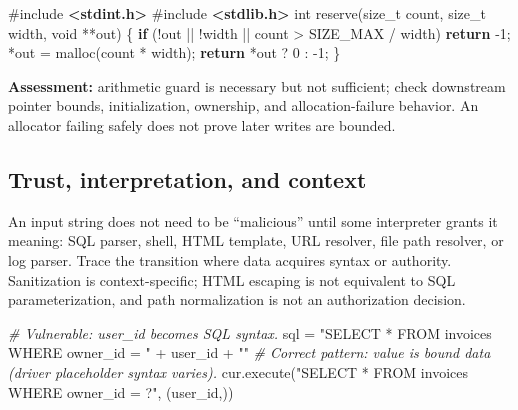 \documentclass[
  letterpaper,
]{article}
\newenvironment{Shaded}{}{}
\newcommand{\CommentTok}[1]{\textcolor[rgb]{0.38,0.63,0.69}{\textit{#1}}}
\newcommand{\ControlFlowTok}[1]{\textcolor[rgb]{0.00,0.44,0.13}{\textbf{#1}}}
\newcommand{\DataTypeTok}[1]{\textcolor[rgb]{0.56,0.13,0.00}{#1}}
\newcommand{\DecValTok}[1]{\textcolor[rgb]{0.25,0.63,0.44}{#1}}
\newcommand{\ImportTok}[1]{\textcolor[rgb]{0.00,0.50,0.00}{\textbf{#1}}}
\newcommand{\NormalTok}[1]{#1}
\newcommand{\OperatorTok}[1]{\textcolor[rgb]{0.40,0.40,0.40}{#1}}
\newcommand{\PreprocessorTok}[1]{\textcolor[rgb]{0.74,0.48,0.00}{#1}}
\newcommand{\StringTok}[1]{\textcolor[rgb]{0.25,0.44,0.63}{#1}}
\begin{document}
\begin{Shaded}
\begin{Highlighting}[]
\PreprocessorTok{\#include }\ImportTok{\textless{}stdint.h\textgreater{}}
\PreprocessorTok{\#include }\ImportTok{\textless{}stdlib.h\textgreater{}}
\DataTypeTok{int}\NormalTok{ reserve}\OperatorTok{(}\DataTypeTok{size\_t}\NormalTok{ count}\OperatorTok{,} \DataTypeTok{size\_t}\NormalTok{ width}\OperatorTok{,} \DataTypeTok{void} \OperatorTok{**}\NormalTok{out}\OperatorTok{)} \OperatorTok{\{}
    \ControlFlowTok{if} \OperatorTok{(!}\NormalTok{out }\OperatorTok{||} \OperatorTok{!}\NormalTok{width }\OperatorTok{||}\NormalTok{ count }\OperatorTok{\textgreater{}}\NormalTok{ SIZE\_MAX }\OperatorTok{/}\NormalTok{ width}\OperatorTok{)} \ControlFlowTok{return} \OperatorTok{{-}}\DecValTok{1}\OperatorTok{;}
    \OperatorTok{*}\NormalTok{out }\OperatorTok{=}\NormalTok{ malloc}\OperatorTok{(}\NormalTok{count }\OperatorTok{*}\NormalTok{ width}\OperatorTok{);}
    \ControlFlowTok{return} \OperatorTok{*}\NormalTok{out }\OperatorTok{?} \DecValTok{0} \OperatorTok{:} \OperatorTok{{-}}\DecValTok{1}\OperatorTok{;}
\OperatorTok{\}}
\end{Highlighting}
\end{Shaded}

\textbf{Assessment:} arithmetic guard is necessary but not sufficient;
check downstream pointer bounds, initialization, ownership, and
allocation-failure behavior. An allocator failing safely does not prove
later writes are bounded.

\subsection{Trust, interpretation, and
context}\label{trust-interpretation-and-context}

An input string does not need to be ``malicious'' until some interpreter
grants it meaning: SQL parser, shell, HTML template, URL resolver, file
path resolver, or log parser. Trace the transition where data acquires
syntax or authority. Sanitization is context-specific; HTML escaping is
not equivalent to SQL parameterization, and path normalization is not an
authorization decision.

\begin{Shaded}
\begin{Highlighting}[]
\CommentTok{\# Vulnerable: user\_id becomes SQL syntax.}
\NormalTok{sql }\OperatorTok{=} \StringTok{"SELECT * FROM invoices WHERE owner\_id = \textquotesingle{}"} \OperatorTok{+}\NormalTok{ user\_id }\OperatorTok{+} \StringTok{"\textquotesingle{}"}
\CommentTok{\# Correct pattern: value is bound data (driver placeholder syntax varies).}
\NormalTok{cur.execute(}\StringTok{"SELECT * FROM invoices WHERE owner\_id = ?"}\NormalTok{, (user\_id,))}
\end{Highlighting}
\end{Shaded}
\end{document}
